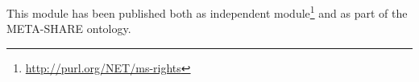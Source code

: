 \documentclass{llncs}
\begin{document}
This module has been published both as independent module\footnote{\url{http://purl.org/NET/ms-rights}} 
and as part of the META-SHARE ontology.


%
%
\end{document}
